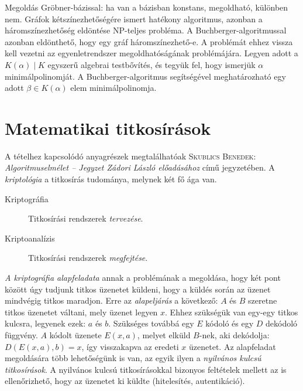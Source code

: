 \documentclass[%
	DIV=15,appendixprefix]{scrreprt}
\theoremstyle{definition}
\theoremstyle{remark}
\begin{document}
Megoldás Gröbner-bázissal: ha van a bázisban konstans, megoldható, különben nem.
%
Gráfok kétszínezhetőségére ismert hatékony algoritmus, azonban a háromszínezhetőség eldöntése
NP-teljes probléma. A Buchberger-algoritmussal azonban eldönthető, hogy egy gráf háromszínezhető-e.
A problémát ehhez vissza kell vezetni az egyenletrendszer megoldhatóságának problémájára.
%
Legyen adott a $ K \left( \alpha \right) \mid K $ egyszerű algebrai testbővítés, és tegyük fel, hogy
ismerjük $ \alpha $ minimálpolinomját. A Buchberger-algoritmus segítségével meghatározható egy adott
$\beta \in K \left( \alpha \right) $ elem minimálpolinomja.
%
\section{Matematikai titkosírások}
A tételhez kapcsolódó anyagrészek megtalálhatóak \textsc{Skublics Benedek}: \emph{Algoritmuselmélet -- Jegyzet Zádori László előadásához} \cite{Zadori} című jegyzetében.
%
A \emph{kriptológia} a titkosírás tudománya, melynek két fő ága van.
\begin{description}
	\item[Kriptográfia] Titkosírási rendszerek \emph{tervezése}.
	\item[Kriptoanalízis] Titkosírási rendszerek \emph{megfejtése}.
\end{description}
\emph{A kriptográfia alapfeladata} annak a problémának a megoldása, hogy két pont között úgy tudjunk
titkos üzenetet küldeni, hogy a küldés során az üzenet mindvégig titkos maradjon. Erre az
\emph{alapeljárás} a következő: $ A $ és $ B $ szeretne titkos üzenetet váltani, mely üzenet legyen
$ x $. Ehhez szükségük van egy-egy titkos kulcsra, legyenek ezek: $ a $ és $ b $. Szükséges továbbá
egy $ E $ kódoló és egy $ D $ dekódoló függvény. $ A $ kódolt üzenete $ E \left( x,{} a \right) $,
melyet elküld $ B $-nek, aki dekódolja: $ D \left(  E \left( x,{} a \right),{} b \right) = x $, így
visszakapva az eredeti $ x $ üzenetet.
%
Az alapfeladat megoldására több lehetőségünk is van, az egyik ilyen a \emph{nyilvános kulcsú
titkosírások}. A nyilvános kulcsú titkosírásokkal bizonyos feltételek mellett az is ellenőrizhető,
hogy az üzenetet ki küldte (hitelesítés, autentikáció).
\end{document}
